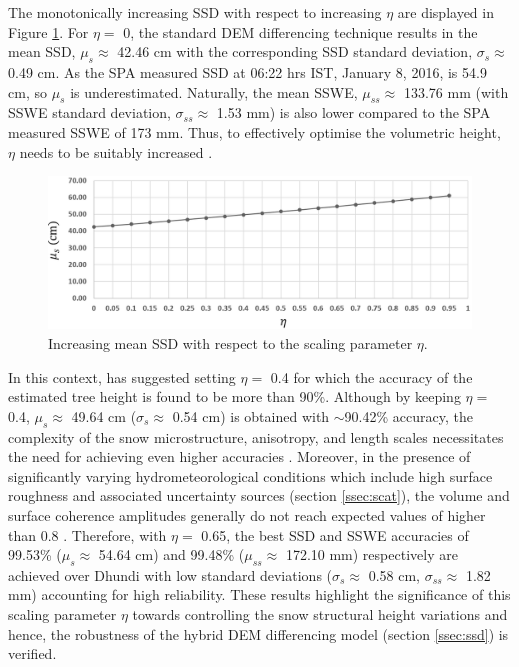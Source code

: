 \documentclass[review]{elsarticle}
\numberwithin{equation}{section}
\numberwithin{figure}{section}
\numberwithin{table}{section}
\begin{document}
The monotonically increasing SSD with respect to increasing $\eta$ are displayed in Figure \ref{fig:eta}. For $\eta =$ 0, the standard DEM differencing technique \citep{Cloude2005} results in the mean SSD, $\mu_s \approx$ 42.46 cm with the corresponding SSD standard deviation, $\sigma_s \approx$ 0.49 cm. As the SPA measured SSD at 06:22 hrs IST, January 8, 2016, is 54.9 cm, so $\mu_s$ is underestimated. Naturally, the mean SSWE, $\mu_{ss} \approx$ 133.76 mm (with SSWE standard deviation, $\sigma_{ss} \approx$ 1.53 mm) is also lower compared to the SPA measured SSWE of 173 mm. Thus, to effectively optimise the volumetric height, $\eta$ needs to be suitably increased \citep{Cloude2005, Cloude2010}.

\begin{figure}[htb]
    \centering
    \includegraphics[width=\textwidth]{Figures/Results/Eta.png}
    \caption{Increasing mean SSD with respect to the scaling parameter $\eta$.}
    \label{fig:eta}
\end{figure}

In this context, \cite{Cloude2005} has suggested setting $\eta = $ 0.4 for which the accuracy of the estimated tree height is found to be more than 90\%. Although by keeping $\eta = $ 0.4, $\mu_s \approx$ 49.64 cm ($\sigma_s \approx$ 0.54 cm) is obtained with $\sim$90.42\% accuracy, the complexity of the snow microstructure, anisotropy, and length scales necessitates the need for achieving even higher accuracies \citep{Leinss2016}. Moreover, in the presence of significantly varying hydrometeorological conditions which include high surface roughness and associated uncertainty sources (section \ref{ssec:scat}), the volume and surface coherence amplitudes generally do not reach expected values of higher than 0.8 \citep{Cloude2005, Kugler2015}. Therefore, with $\eta = $ 0.65, the best SSD and SSWE accuracies of 99.53\% ($\mu_s \approx$ 54.64 cm) and 99.48\% ($\mu_{ss} \approx$ 172.10 mm) respectively are achieved over Dhundi with low standard deviations ($\sigma_s \approx$ 0.58 cm, $\sigma_{ss} \approx$ 1.82 mm) accounting for high reliability. These results highlight the significance of this scaling parameter $\eta$ towards controlling the snow structural height variations \citep{Cloude2005, Cloude2010} and hence, the robustness of the hybrid DEM differencing model (section \ref{ssec:ssd}) is verified.
\end{document}
